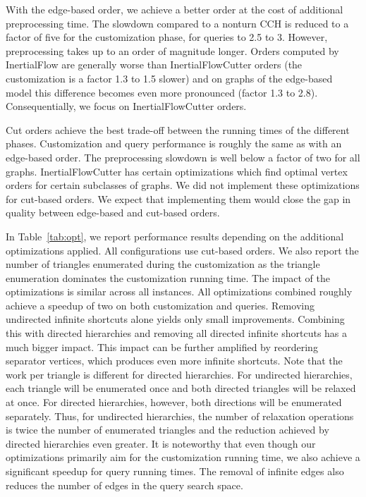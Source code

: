 \documentclass[a4paper, english, cleveref]{lipics-v2021}
\begin{document}
With the edge-based order, we achieve a better order at the cost of additional preprocessing time.
The slowdown compared to a nonturn CCH is reduced to a factor of five for the customization phase, for queries to 2.5 to 3.
However, preprocessing takes up to an order of magnitude longer.
Orders computed by InertialFlow are generally worse than InertialFlowCutter orders (the customization is a factor 1.3 to 1.5 slower) and on graphs of the edge-based model this difference becomes even more pronounced (factor 1.3 to 2.8).
Consequentially, we focus on InertialFlowCutter orders.

Cut orders achieve the best trade-off between the running times of the different phases.
Customization and query performance is roughly the same as with an edge-based order.
The preprocessing slowdown is well below a factor of two for all graphs.
InertialFlowCutter has certain optimizations which find optimal vertex orders for certain subclasses of graphs.
We did not implement these optimizations for cut-based orders.
We expect that implementing them would close the gap in quality between edge-based and cut-based orders.

In Table~\ref{tab:opt}, we report performance results depending on the additional optimizations applied.
All configurations use cut-based orders.
We also report the number of triangles enumerated during the customization as the triangle enumeration dominates the customization running time.
The impact of the optimizations is similar across all instances.
All optimizations combined roughly achieve a speedup of two on both customization and queries.
Removing undirected infinite shortcuts alone yields only small improvements.
Combining this with directed hierarchies and removing all directed infinite shortcuts has a much bigger impact.
This impact can be further amplified by reordering separator vertices, which produces even more infinite shortcuts.
Note that the work per triangle is different for directed hierarchies.
For undirected hierarchies, each triangle will be enumerated once and both directed triangles will be relaxed at once.
For directed hierarchies, however, both directions will be enumerated separately.
Thus, for undirected hierarchies, the number of relaxation operations is twice the number of enumerated triangles and the reduction achieved by directed hierarchies even greater.
It is noteworthy that even though our optimizations primarily aim for the customization running time, we also achieve a significant speedup for query running times.
The removal of infinite edges also reduces the number of edges in the query search space.
\end{document}
